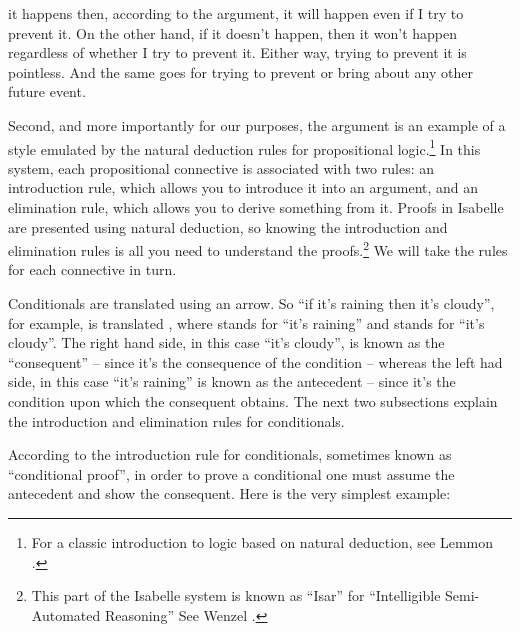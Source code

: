 \begin{isabellebody}
\begin{isamarkuptext}
it happens then, according to the argument, it will happen even if I try to prevent it. On the other
hand, if it doesn't happen, then it won't happen regardless of whether I try to prevent it. Either
way, trying to prevent it is pointless. And the same goes for trying to prevent or bring about any
other future event.%
\end{isamarkuptext}\isamarkuptrue%
%
\begin{isamarkuptext}%
Second, and more importantly for our purposes, the argument is an example of a style emulated
by the natural deduction rules for propositional logic.\footnote{For a classic introduction to logic 
based on natural deduction, see Lemmon \cite{lemmon_beginning_1965}.} In this system, each propositional connective
is associated with two rules: an introduction rule, which allows you to introduce it into an argument, 
and an elimination rule, which allows you to derive something from it. Proofs in Isabelle are presented
using natural deduction, so knowing the introduction and elimination rules is all you need to understand
the proofs.\footnote{This part of the Isabelle system is known as ``Isar'' for ``Intelligible Semi-Automated Reasoning'' 
See Wenzel \cite{wenzel_isabelle/isarversatile_2002}.} We will take the rules for each connective in turn.%
\end{isamarkuptext}\isamarkuptrue%
%
\isamarkuptrue%
%
\begin{isamarkuptext}%
Conditionals are translated using an arrow. So ``if it's raining then it's cloudy'', for
example, is translated , where  stands for ``it's raining'' and 
stands for ``it's cloudy''. The right hand side, in this case ``it's cloudy'', is known as the
``consequent'' -- since it's the consequence of the condition -- whereas the left had side, in this
case ``it's raining'' is known as the antecedent -- since it's the condition upon which the consequent
obtains. The next two subsections explain the introduction and elimination rules for conditionals.%
\end{isamarkuptext}\isamarkuptrue%
%
\isamarkuptrue%
%
\begin{isamarkuptext}%
According to the introduction rule for conditionals, sometimes known as ``conditional proof'',
in order to prove a conditional one must assume the antecedent and show the consequent. Here is the
very simplest example:%
\end{isamarkuptext}\isamarkuptrue%

\end{isabellebody}
